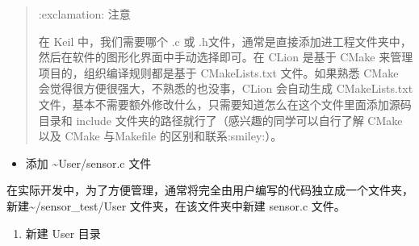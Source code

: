 \documentclass[a4paper,12pt,english]{sphinxmanual}
\begin{document}
\begin{sphinxVerbatim}[commandchars=\\\{\}]


\end{sphinxVerbatim}
\begin{quote}

\sphinxAtStartPar
:exclamation: 注意

\sphinxAtStartPar
在 Keil 中，我们需要哪个 .c 或 .h文件，通常是直接添加进工程文件夹中，然后在软件的图形化界面中手动选择即可。在 CLion 是基于 CMake 来管理项目的，组织编译规则都是基于 CMakeLists.txt 文件。如果熟悉 CMake 会觉得很方便很强大，不熟悉的也没事，CLion 会自动生成 CMakeLists.txt 文件，基本不需要额外修改什么，只需要知道怎么在这个文件里面添加源码目录和 include 文件夹的路径就行了（感兴趣的同学可以自行了解 CMake 以及 CMake 与Makefile 的区别和联系:smiley:）。
\end{quote}
\begin{itemize}
\item {} 
\sphinxAtStartPar
添加 \textasciitilde{}User/sensor.c 文件

\end{itemize}

\sphinxAtStartPar
在实际开发中，为了方便管理，通常将完全由用户编写的代码独立成一个文件夹，新建\textasciitilde{}/sensor\_test/User 文件夹，在该文件夹中新建 sensor.c 文件。
\begin{enumerate}
%
\item {} 
\sphinxAtStartPar
新建 User 目录

\end{enumerate}
\end{document}
